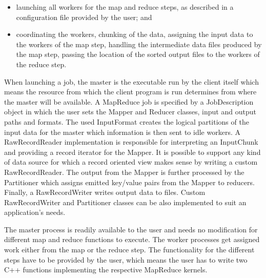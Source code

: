 \documentclass[3p,twocolumn]{elsarticle}
\begin{document}
\begin{itemize}

 \item launching all workers for the map and reduce steps, as
 described in a configuration file provided by the user; and

 \item coordinating the workers, chunking of the data, assigning the
 input data to the workers of the map step, handling the intermediate
 data files produced by the map step, passing the location of the
 sorted output files to the workers of the reduce step.  


\end{itemize}

When launching a job, the master is the executable run by the client itself
which means the resource from which the client program is run determines
from where the master will be available.
A MapReduce job is specified by a JobDescription object in which the user
sets the Mapper and Reducer classes, input and output paths and formats.  The
used InputFormat creates the logical partitions of the input data for the
master which information is then sent to idle workers.  A RawRecordReader
implementation is responsible for interpreting an InputChunk and providing
a record iterator for the Mapper. It is possible to support any kind of data
source for which a record oriented view makes sense by writing a custom
RawRecordReader.  The output from the Mapper is further processed by the
Partitioner which assigns emitted key/value pairs from the Mapper to reducers.
Finally, a RawRecordWriter writes output data to files.  Custom RawRecordWriter
and Partitioner classes can be also implemented to suit an application's needs.

The master process is readily available to the user and needs no
modification for different map and reduce functions to execute.  The
worker processes get assigned work either from the map or the reduce
step. The functionality for the different steps have to be provided by
the user, which means the user has to write two C++ functions
implementing the respective MapReduce kernels.
\end{document}
